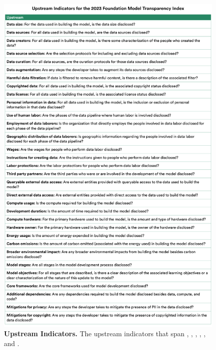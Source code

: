 \begin{figure}
\centering
\includegraphics[keepaspectratio, height=\textheight, width=\textwidth]{figures/indicators_list_upstream.pdf}
\caption{\textbf{Upstream Indicators.} The \numupstreamindicators upstream indicators that span \data, \labor, \dataaccess, \compute, \methods, and \datamitigations.}
\label{fig:upstream-indicators}
\end{figure}

